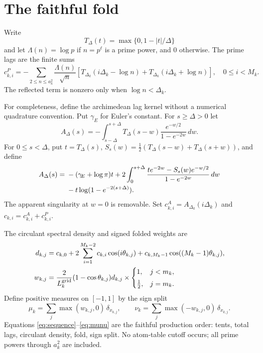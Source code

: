 \documentclass[11pt]{article}
\begin{document}
\section{The faithful fold}

Write
\[
 T_\Delta(t)=\max\{0,1-|t|/\Delta\}
\]
and let $\Lambda(n)=\log p$ if $n=p^\ell$ is a prime power, and
$0$ otherwise.  The prime lags are the finite sums
\begin{equation}\label{eq:prime-lag}
 c^P_{k,i}
 =-\sum_{2\le n\le a_k^2}\frac{\Lambda(n)}{\sqrt n}
 \left[
 T_{\Delta_k}(i\Delta_k-\log n)
 +T_{\Delta_k}(i\Delta_k+\log n)
 \right],
 \quad 0\le i<M_k .
\end{equation}
The reflected term is nonzero only when $\log n<\Delta_k$.

For completeness, define the archimedean lag kernel without a
numerical quadrature convention.  Put $\gamma_{\!E}$ for Euler's
constant.  For $s\ge\Delta>0$ let
\begin{equation}\label{eq:arch-far}
 A_\Delta(s)=-
 \int_{s-\Delta}^{s+\Delta}
 T_\Delta(s-w)\frac{e^{-w/2}}{1-e^{-2w}}\,dw .
\end{equation}
For $0\le s<\Delta$, put $t=T_\Delta(s)$,
$S_s(w)=\frac12(T_\Delta(s-w)+T_\Delta(s+w))$, and define
\begin{align}
A_\Delta(s)={}&-(\gamma_{\!E}+\log\pi)t
+2\int_0^{s+\Delta}
\frac{t e^{-2w}-S_s(w)e^{-w/2}}{1-e^{-2w}}\,dw \notag\\
&{}-t\log(1-e^{-2(s+\Delta)}).
\label{eq:arch-near}
\end{align}
The apparent singularity at $w=0$ is removable.  Set
$c^A_{k,i}=A_{\Delta_k}(i\Delta_k)$ and
$c_{k,i}=c^A_{k,i}+c^P_{k,i}$.

The circulant spectral density and signed folded weights are
\begin{align}
d_{k,j}
 &=
 c_{k,0}+2\sum_{i=1}^{M_k-2}c_{k,i}\cos(i\theta_{k,j})
 +c_{k,M_k-1}\cos((M_k-1)\theta_{k,j}),\label{eq:density}\\
w_{k,j}
 &=
\frac{2}{L_k^{\rm grid}}(1-\cos\theta_{k,j})d_{k,j}
\times
\begin{cases}
1,&j<m_k,\\[1mm]
\frac12,&j=m_k.
\end{cases}\label{eq:fold-weight}
\end{align}
Define positive measures on $[-1,1]$ by the sign split
\begin{equation}\label{eq:munu}
 \mu_k=\sum_j\max(w_{k,j},0)\,\delta_{x_{k,j}},
 \qquad
 \nu_k=\sum_j\max(-w_{k,j},0)\,\delta_{x_{k,j}} .
\end{equation}
Equations \eqref{eq:sequence}--\eqref{eq:munu} are the faithful
production order: tents, total lags, circulant density, fold, sign
split.  No atom-table cutoff occurs; all prime powers through
$a_k^2$ are included.
\end{document}
